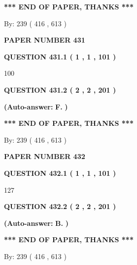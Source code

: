\documentclass{ctexart}
\begin{document}
 
   
   
   
   
\vspace{1.0in} 
{\textbf{\large{ *** END OF PAPER, THANKS *** }}} 
   
   
\hspace{1.0in} By: 
 239 ( 416 ,  613 )
   
   
   
   
\newpage 
\setcounter{page}{ 
   431001 } 
   
   
 {\textbf{ \Large{ PAPER NUMBER  431  }}}
   
   
   
   
  
  
{\textbf{\large{QUESTION
431.1 
 ( 1 , 1 , 101 )
}}}

100
  
  
{\textbf{\large{QUESTION
431.2 
 ( 2 , 2 , 201 )
}}}
 
 
{\textbf{(Auto-answer:}}
{\textbf{\large{
F.}}}
{\textbf{)}}
 
 
   
   
   
   
\vspace{1.0in} 
{\textbf{\large{ *** END OF PAPER, THANKS *** }}} 
   
   
\hspace{1.0in} By: 
 239 ( 416 ,  613 )
   
   
   
   
\newpage 
\setcounter{page}{ 
   432001 } 
   
   
 {\textbf{ \Large{ PAPER NUMBER  432  }}}
   
   
   
   
  
  
{\textbf{\large{QUESTION
432.1 
 ( 1 , 1 , 101 )
}}}

127
  
  
{\textbf{\large{QUESTION
432.2 
 ( 2 , 2 , 201 )
}}}
 
 
{\textbf{(Auto-answer:}}
{\textbf{\large{
B.}}}
{\textbf{)}}
 
 
   
   
   
   
\vspace{1.0in} 
{\textbf{\large{ *** END OF PAPER, THANKS *** }}} 
   
   
\hspace{1.0in} By: 
 239 ( 416 ,  613 )
   
   
   
   
\newpage 
\setcounter{page}{ 
   433001 } 
   
\end{document}
